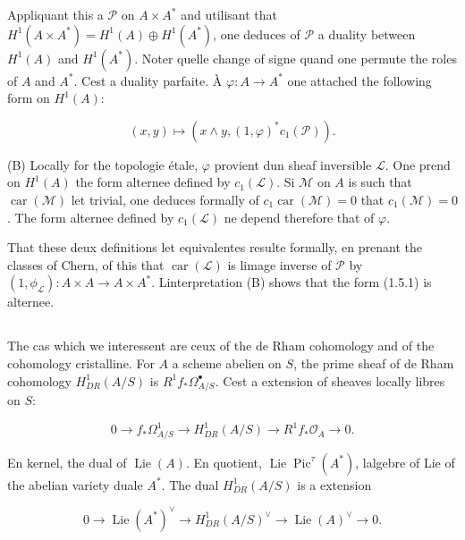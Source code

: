 \documentclass[11pt,a4paper]{article}
\theoremstyle{plain}
\theoremstyle{definition}
\DeclareMathOperator{\Lie}{Lie}
\DeclareMathOperator{\car}{car}
\DeclareMathOperator{\Pic}{Pic}
\begin{document}
Appliquant this a $\mathscr{P}$ on $A \times A^*$ and utilisant that $H^1(A \times A^*) =
H^1(A) \oplus H^1(A^*)$, one deduces of $\mathscr{P}$ a duality between $H^1(A)$ and $H^1(A^*)$. Noter
quelle change of signe quand one permute the roles of $A$ and $A^*$. Cest a duality
parfaite. \`A $\varphi: A \to A^*$ one attached the following form on $H^1(A)$:

\begin{equation}
(x, y) \longmapsto (x \wedge y, (1, \varphi)^* c_1(\mathscr{P})).
\end{equation}

(B) Locally for the topologie étale, $\varphi$ provient dun sheaf inversible
$\mathscr{L}$. One prend on $H^1(A)$ the form alternee defined by $c_1(\mathscr{L})$. Si $\mathscr{M}$ on $A$ is such that $\car(\mathscr{M})$ let trivial, one deduces formally of $c_1 \car(\mathscr{M}) = 0$ that $c_1(\mathscr{M}) = 0$.
The form alternee defined by $c_1(\mathscr{L})$ ne depend therefore that of $\varphi$.

That these deux definitions let equivalentes resulte formally, en prenant
the classes of Chern, of this that $\car(\mathscr{L})$ is limage inverse of $\mathscr{P}$ by
$(1, \phi_{\mathscr{L}}): A \times A \to A \times A^*$. Linterpretation (B) shows that the form (1.5.1) is
alternee.

\subsection{}

The cas which we interessent are ceux of the de Rham cohomology and
of the cohomology cristalline. For $A$ a scheme abelien on $S$, the prime
sheaf of de Rham cohomology $H^1_{DR}(A/S)$ is $R^1f_* \Omega^\bullet_{A/S}$. Cest a
extension of sheaves locally libres on $S$:

\begin{equation}
0 \longrightarrow f_* \Omega^1_{A/S} \longrightarrow H^1_{DR}(A/S) \longrightarrow R^1f_* \mathscr{O}_A \longrightarrow 0.
\end{equation}

En kernel, the dual of $\Lie(A)$. En quotient, $\Lie \Pic^\tau(A^*)$, lalgebre of Lie of the
abelian variety duale $A^*$. The dual $H_{DR}^1(A/S)$ is a extension

\begin{equation}
0 \longrightarrow \Lie(A^*)^\vee \longrightarrow H^1_{DR}(A/S)^\vee \longrightarrow \Lie(A)^\vee \longrightarrow 0.
\end{equation}
\end{document}
